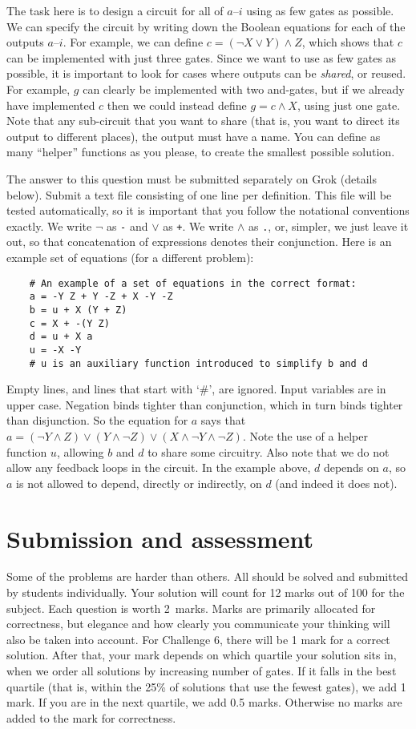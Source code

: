 \documentclass[12pt]{article}
\begin{document}
The task here is to design a circuit for all of $a$--$i$ using as
few gates as possible.
We can specify the circuit by writing down the Boolean equations
for each of the outputs $a$--$i$.
For example, we can define $c = (\neg X \lor Y) \land Z$, which shows
that $c$ can be implemented with just three gates.
Since we want to use as few gates as possible, it is important to
look for cases where outputs can be \emph{shared}, or reused.
For example, $g$ can clearly be implemented with two and-gates,
but if we already have implemented $c$ then we could instead
define $g = c \land X$, using just one gate.
Note that any sub-circuit that you want to share (that is, you
want to direct its output to different places), the output must
have a name.
You can define as many ``helper'' functions as you please, to
create the smallest possible solution.

The answer to this question must be submitted separately on Grok
(details below).
Submit a text file consisting of one line per definition.
This file will be tested automatically, so it is important that
you follow the notational conventions exactly.
We write $\neg$ as \texttt{-} and $\lor$ as \texttt{+}.
We write $\land$ as \texttt{.}, or, simpler, we just leave it out,
so that concatenation of expressions denotes their conjunction.
Here is an example set of equations (for a different problem):
\begin{verbatim}
    # An example of a set of equations in the correct format:
    a = -Y Z + Y -Z + X -Y -Z
    b = u + X (Y + Z)
    c = X + -(Y Z)
    d = u + X a
    u = -X -Y
    # u is an auxiliary function introduced to simplify b and d
\end{verbatim}
Empty lines, and lines that start with `\#', are ignored.
Input variables are in upper case.
Negation binds tighter than conjunction, which in
turn binds tighter than disjunction.
So the equation for $a$ says that
$a = (\neg Y \land Z) \lor (Y \land \neg Z) \lor (X \land \neg Y \land \neg Z)$.
Note the use of a helper function $u$, allowing $b$ and $d$ to
share some circuitry.
Also note that we do not allow any feedback loops in the circuit.
In the example above, $d$ depends on $a$, so $a$ is not allowed
to depend, directly or indirectly, on $d$ (and indeed it does not).

\section*{Submission and assessment}
Some of the problems are harder than others.
All should be solved and submitted by students individually.
Your solution will count for 12 marks out of 100 for the subject.
Each question is worth 2~marks.
Marks are primarily allocated for correctness, but elegance and how
clearly you communicate your thinking will also be taken into account.
For Challenge 6, there will be 1 mark for a correct solution. 
After that, your mark depends on which quartile your solution sits in, 
when we order all solutions by increasing number of gates.
If it falls in the best quartile (that is, within the 25\% of
solutions that use the fewest gates), we add 1 mark.
If you are in the next quartile, we add 0.5 marks.
Otherwise no marks are added to the mark for correctness.
\end{document}
